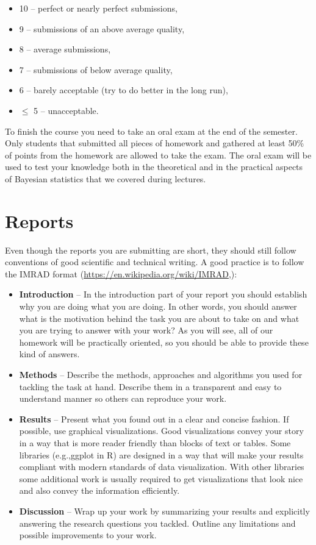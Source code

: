 \documentclass[fleqn,moreauthors,10pt]{ds_report}
\begin{document}
\begin{itemize}
	\item 10 -- perfect or nearly perfect submissions,
	\item 9 -- submissions of an above average quality,
	\item 8 -- average submissions,
	\item 7 -- submissions of below average quality,
	\item 6 -- barely acceptable (try to do better in the long run),
	\item $\leq$ 5 -- unacceptable.
\end{itemize}

To finish the course you need to take an oral exam at the end of the semester. Only students that submitted all pieces of homework and gathered at least 50\% of points from the homework are allowed to take the exam. The oral exam will be used to test your knowledge both in the theoretical and in the practical aspects of Bayesian statistics that we covered during lectures.

\section*{Reports}

Even though the reports you are submitting are short, they should still follow conventions of good scientific and technical writing. A good practice is to follow the IMRAD format (\url{https://en.wikipedia.org/wiki/IMRAD},):

\begin{itemize}
	\item \textbf{Introduction} -- In the introduction part of your report you should establish why you are doing what you are doing. In other words, you should answer what is the motivation behind the task you are about to take on and what you are trying to answer with your work? As you will see, all of our homework will be practically oriented, so you should be able to provide these kind of answers.
	\item \textbf{Methods} -- Describe the methods, approaches and algorithms you used for tackling the task at hand. Describe them in a transparent and easy to understand manner so others can reproduce your work.
	\item \textbf{Results} -- Present what you found out in a clear and concise fashion. If possible, use graphical visualizations. Good visualizations convey your story in a way that is more reader friendly than blocks of text or tables. Some libraries (e.g.,ggplot in R) are designed in a way that will make your results compliant with modern standards of data visualization. With other libraries some additional work is usually required to get visualizations that look nice and also convey the information efficiently.
	\item \textbf{Discussion} -- Wrap up your work by summarizing your results and explicitly answering the research questions you tackled. Outline any limitations and possible improvements to your work.
\end{itemize}
\end{document}
